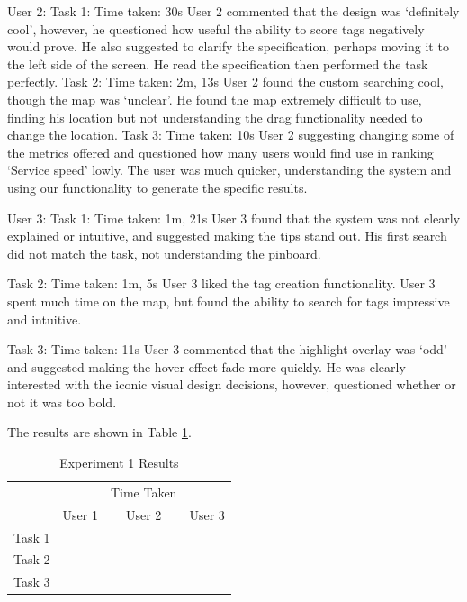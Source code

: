 \documentclass[10pt,a4paper]{article}
\begin{document}
User 2:
Task 1:
Time taken: 30s
User 2 commented that the design was ‘definitely cool’, however, he questioned how useful the ability to score tags negatively would prove. He also suggested to clarify the specification, perhaps moving it to the left side of the screen.
He read the specification then performed the task perfectly.
Task 2:
Time taken: 2m, 13s
User 2 found the custom searching cool, though the map was ‘unclear’.
He found the map extremely difficult to use, finding his location but not understanding the drag functionality needed to change the location.
Task 3:
Time taken: 10s
User 2 suggesting changing some of the metrics offered and questioned how many users would find use in ranking ‘Service speed’ lowly.
The user was much quicker, understanding the system and using our functionality to generate the specific results.

User 3:
Task 1:
Time taken: 1m, 21s
User 3 found that the system was not clearly explained or intuitive, and suggested making the tips stand out.
His first search did not match the task, not understanding the pinboard.

Task 2:
Time taken: 1m, 5s
User 3 liked the tag creation functionality.
User 3 spent much time on the map, but found the ability to search for tags impressive and intuitive.

Task 3:
Time taken: 11s
User 3 commented that the highlight overlay was ‘odd’ and suggested making the hover effect fade more quickly.
He was clearly interested with the iconic visual design decisions, however, questioned whether or not it was too bold.


The results are shown in Table \ref{table:experiment-1}.

\begin{table}[H]
\centering
\begin{tabular}{c|ccc|}
\cline{2-4}
                             &                             & Time Taken                  &        \\ \cline{2-4} 
                             & \multicolumn{1}{c|}{User 1} & \multicolumn{1}{c|}{User 2} & User 3 \\ \hline
\multicolumn{1}{|c|}{Task 1} & \multicolumn{1}{c|}{}       & \multicolumn{1}{c|}{}       &        \\ \hline
\multicolumn{1}{|c|}{Task 2} & \multicolumn{1}{c|}{}       & \multicolumn{1}{c|}{}       &        \\ \hline
\multicolumn{1}{|c|}{Task 3} & \multicolumn{1}{c|}{}       & \multicolumn{1}{c|}{}       &        \\ \hline
\end{tabular}
\caption{Experiment 1 Results \label{table:experiment-1}}
\end{table}
\end{document}
